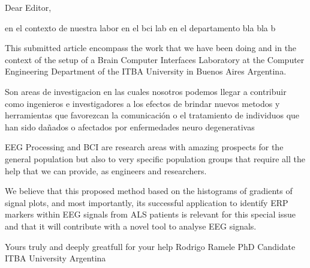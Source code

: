 Dear Editor, 

en el contexto de nuestra labor en el bci lab en el departamento bla bla b

This submitted article encompass the work that we have been doing and in the context of the setup of a Brain Computer Interfaces Laboratory at the Computer Engineering Department of the ITBA University in Buenos Aires Argentina.

Son areas de investigacion en las cuales nosotros podemos llegar a contribuir como ingenieros e investigadores a los efectos de brindar nuevos metodos y herramientas que favorezcan la comunicación o el tratamiento de individuos que han sido dañados o afectados por enfermedades neuro degenerativas

EEG Processing and BCI are research areas with amazing prospects for the general population but also to very specific population groups that require all the help that we can provide, as engineers and researchers.



We believe that this proposed method based on the histograms of gradients of signal plots, and most importantly, its successful application to identify ERP markers within EEG signals from ALS patients is relevant for this special issue and that it will contribute with a novel tool to analyse EEG signals.

Yours truly and deeply greatfull for your help
Rodrigo Ramele
PhD Candidate
ITBA University 
Argentina